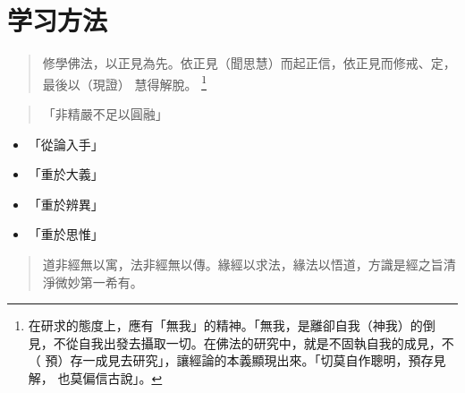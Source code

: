 \section{学习方法}

\begin{quote}
  修學佛法，以正見為先。依正見（聞思慧）而起正信，依正見而修戒、定，最後以（現證） 慧得解脫。
  \footnote{在研求的態度上，應有「無我」的精神。「無我，是離卻自我（神我）的倒 見，不從自我出發去攝取一切。在佛法的研究中，就是不固執自我的成見，不（ 預）存一成見去研究」，讓經論的本義顯現出來。「切莫自作聰明，預存見解， 也莫偏信古說」。}
\end{quote}

\begin{quote}
  「非精嚴不足以圓融」
\end{quote}

\begin{itemize}
  \item 「從論入手」
  \item 「重於大義」
  \item 「重於辨異」
  \item 「重於思惟」
\end{itemize}

\begin{quote}
  道非經無以寓，法非經無以傳。緣經以求法，緣法以悟道，方識是經之旨清淨微妙第一希有。
\end{quote}
